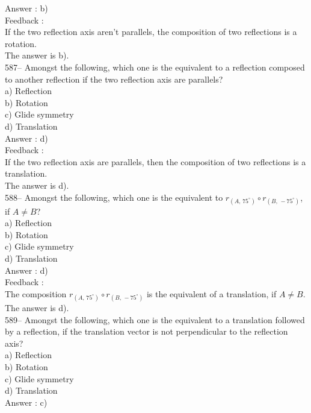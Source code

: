 \documentclass[letterpaper, 12pt]{article}
\begin{document}
Answer : b) \\

Feedback : \\
If the two reflection axis aren't parallels, the composition of two reflections is a rotation.\\
The answer is b).\\

587-- Amongst the following, which one is the equivalent to a reflection composed to another reflection if the two reflection axis are parallels?\\
a) Reflection\\
b) Rotation\\
c) Glide symmetry\\
d) Translation\\

Answer : d) \\

Feedback : \\
If the two reflection axis are parallels, then the composition of two reflections is a translation.\\
The answer is d).\\

588-- Amongst the following, which one is the equivalent to
$r_{\left(A,\,75^{\circ}\right)} \circ r_{\left(B,\,-75^{\circ}\right) }$,
if $A\neq B$?\\
a) Reflection\\
b) Rotation\\
c) Glide symmetry\\
d) Translation\\

Answer : d)\\

Feedback : \\
The composition $r_{\left(A,\,75^{\circ}\right)} \circ
r_{\left(B,\,-75^{\circ}\right) }$ is the equivalent of a translation, if
$A\neq B$.  The answer is d).\\

589-- Amongst the following, which one is the equivalent to a translation followed by a reflection, if the translation vector is not perpendicular to the reflection axis?\\
a) Reflection\\
b) Rotation\\
c) Glide symmetry\\
d) Translation\\

Answer : c)\\
\end{document}
